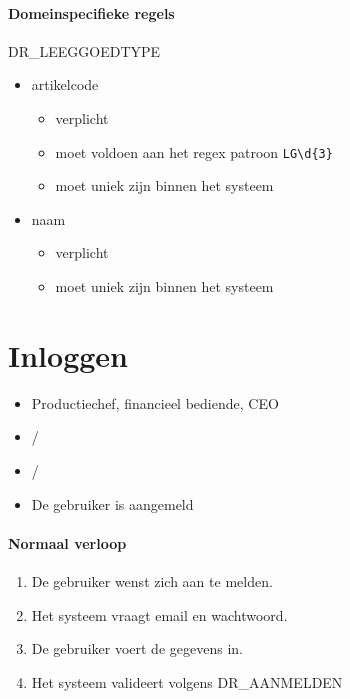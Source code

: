 \paragraph{Domeinspecifieke regels}
DR\_LEEGGOEDTYPE
\begin{itemize}
    \item artikelcode
    \begin{itemize}
        \item verplicht
        \item moet voldoen aan het regex patroon \texttt{LG\textbackslash d\{3\}}
        \item moet uniek zijn binnen het systeem
    \end{itemize}
    \item naam
    \begin{itemize}
        \item verplicht
        \item moet uniek zijn binnen het systeem
    \end{itemize}
\end{itemize}

\vspace{1cm}

\section{Inloggen}
\label{uc:inloggen}

    \vspace{0.5em}

    \begin{itemize}[leftmargin=3.5cm, labelsep=0.5cm, nosep]
        \item[\textbf{Primaire actor:}] Productiechef, financieel bediende, CEO
        \item[\textbf{Stakeholders:}] /
        \item[\textbf{Precondities:}] /
        \item[\textbf{Postcondities:}] De gebruiker is aangemeld
    \end{itemize}

    \paragraph{Normaal verloop}
    \begin{enumerate}[nosep]
        \item De gebruiker wenst zich aan te melden.
        \item Het systeem vraagt email en wachtwoord.
        \item De gebruiker voert de gegevens in.
        \item Het systeem valideert volgens DR\_AANMELDEN
    \end{enumerate}

